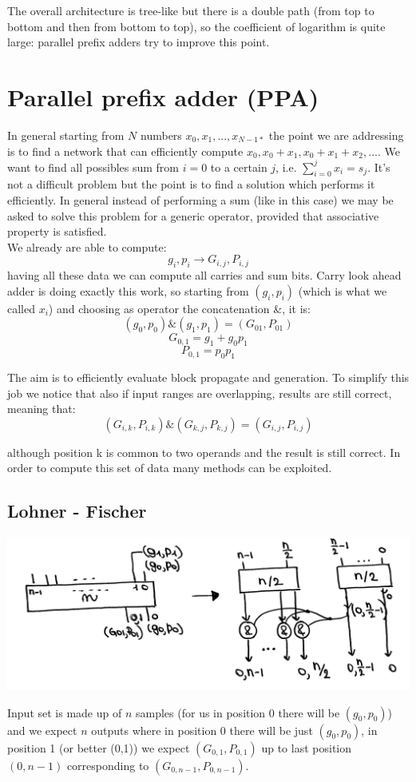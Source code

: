 The overall architecture is tree-like but there is a double path (from top to bottom and then from bottom to top), so the coefficient of logarithm is quite large: parallel prefix adders try to improve this point.

\section{Parallel prefix adder (PPA)}

In general starting from $N$ numbers $x_0, x_1, ...,x_{N-1*}$ the point we are addressing is to find a network that can efficiently compute $x_0, x_0+x_1, x_0+x_1+x_2, ...$. We want to find all possibles sum from $i=0$ to a certain $j$, i.e. $\sum_{i=0}^{j} x_i=s_j$. It's not a difficult problem but the point is to find a solution which performs it efficiently. In general instead of performing a sum (like in this case) we may be asked to solve this problem for a generic operator, provided that associative property is satisfied.\\

We already are able to compute:
$$g_i, p_i \longrightarrow G_{i, j}, P_{i, j} $$
having all these data we can compute all carries and sum bits. Carry look ahead adder is doing exactly this work, so starting from $(g_i, p_i)$ (which is what we called $x_i$) and choosing as operator the concatenation \&, it is:
$$(g_0, p_0) \& (g_1, p_1)=(G_{01}, P_{01})$$
$$G_{0,1}=g_1+g_0p_1$$
$$P_{0,1}=p_0p_1$$

The aim is to efficiently evaluate block propagate and generation. To simplify this job we notice that also if input ranges are overlapping, results are still correct, meaning that:
$$(G_{i,k}, P_{i, k}) \& (G_{k, j}, P_{k, j}) = (G_{i,j}, P_{i, j})$$

although position k is common to two operands and the result is still correct. In order to compute this set of data many methods can be exploited.

\subsection{Lohner - Fischer}
\begin{center}
  \includegraphics[width=0.7\linewidth]{img/img2/20}
\end{center}
Input set is made up of $n$ samples (for us in position 0 there will be $(g_0, p_0)$) and we expect $n$ outputs where in position 0 there will be just $(g_0, p_0)$, in position 1 (or better (0,1)) we expect $(G_{0,1}, P_{0,1})$ up to last position $(0, n-1)$ corresponding to $(G_{0,n-1}, P_{0,n-1})$.


